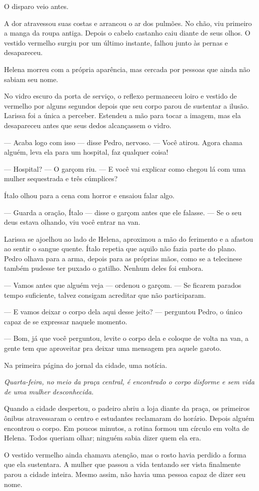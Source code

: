 O disparo veio antes.

A dor atravessou suas costas e arrancou o ar dos pulmões. No chão, viu primeiro a manga da roupa antiga. Depois o cabelo castanho caiu diante de seus olhos. O vestido vermelho surgiu por um último instante, falhou junto às pernas e desapareceu.

Helena morreu com a própria aparência, mas cercada por pessoas que ainda não sabiam seu nome.

No vidro escuro da porta de serviço, o reflexo permaneceu loiro e vestido de vermelho por alguns segundos depois que seu corpo parou de sustentar a ilusão. Larissa foi a única a perceber. Estendeu a mão para tocar a imagem, mas ela desapareceu antes que seus dedos alcançassem o vidro.

— Acaba logo com isso — disse Pedro, nervoso. — Você atirou. Agora chama alguém, leva ela para um hospital, faz qualquer coisa!

— Hospital? — O garçom riu. — E você vai explicar como chegou lá com uma mulher sequestrada e três cúmplices?

Ítalo olhou para a cena com horror e ensaiou falar algo.

— Guarda a oração, Ítalo — disse o garçom antes que ele falasse. — Se o seu deus estava olhando, viu você entrar na van.

Larissa se ajoelhou ao lado de Helena, aproximou a mão do ferimento e a afastou ao sentir o sangue quente. Ítalo repetia que aquilo não fazia parte do plano. Pedro olhava para a arma, depois para as próprias mãos, como se a telecinese também pudesse ter puxado o gatilho. Nenhum deles foi embora.

— Vamos antes que alguém veja — ordenou o garçom. — Se ficarem parados tempo suficiente, talvez consigam acreditar que não participaram.

— E vamos deixar o corpo dela aqui desse jeito? — perguntou Pedro, o único capaz de se expressar naquele momento.

— Bom, já que você perguntou, levite o corpo dela e coloque de volta na van, a gente tem que aproveitar pra deixar uma mensagem pra aquele garoto.

Na primeira página do jornal da cidade, uma notícia.

\emph{Quarta-feira, no meio da praça central, é encontrado o corpo disforme e sem vida de uma mulher desconhecida.}

Quando a cidade despertou, o padeiro abriu a loja diante da praça, os primeiros ônibus atravessaram o centro e estudantes reclamaram do horário. Depois alguém encontrou o corpo. Em poucos minutos, a rotina formou um círculo em volta de Helena. Todos queriam olhar; ninguém sabia dizer quem ela era.

O vestido vermelho ainda chamava atenção, mas o rosto havia perdido a forma que ela sustentara. A mulher que passou a vida tentando ser vista finalmente parou a cidade inteira. Mesmo assim, não havia uma pessoa capaz de dizer seu nome.

